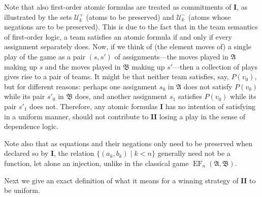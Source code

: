 \documentclass[12pt]{article}
\theoremstyle{definition}
\newcommand{\playerone}{\mathrm{\mathbf{I}}}
\newcommand{\playertwo}{\mathrm{\mathbf{II}}}
\DeclareMathOperator{\EF}{EF}
\newcommand{\U}{\mathcal U}
\newcommand{\A}{\mathfrak{A}}
\newcommand{\B}{\mathfrak{B}}
\begin{document}
Note that also first-order atomic formulas are treated as commitments of $\playerone$, as illustrated by the sets $\U^+_k$ (atoms to be preserved) and $\U^-_k$ (atoms whose negations are to be preserved). This is due to the fact that in the team semantics of first-order logic, a team satisfies an atomic formula if and only if every assignment separately does. Now, if we think of (the element moves of) a single play of the game as a pair $(s,s')$ of assignments---the moves played in $\A$ making up $s$ and the moves played in $\B$ making up $s'$---then a collection of plays gives rise to a pair of teams. It might be that neither team satisfies, say, $P(v_0)$, but for different reasons: perhaps one assignment $s_0$ in $\A$ does not satisfy $P(v_0)$ while its pair $s'_0$ in $\B$ does, and another assignment $s_1$ satisfies $P(v_0)$ while its pair $s'_1$ does not. Therefore, any atomic formulas $\playerone$ has no intention of satisfying in a uniform manner, should not contribute to $\playertwo$ losing a play in the sense of dependence logic.

Note also that as equations and their negations only need to be preserved when declared so by $\playerone$, the relation $\{ (a_k, b_k) \mid k<n \}$ generally need not be a function, let alone an injection, unlike in the classical game $\EF_n(\A,\B)$.

Next we give an exact definition of what it means for a winning strategy of $\playertwo$ to be uniform.
\end{document}

